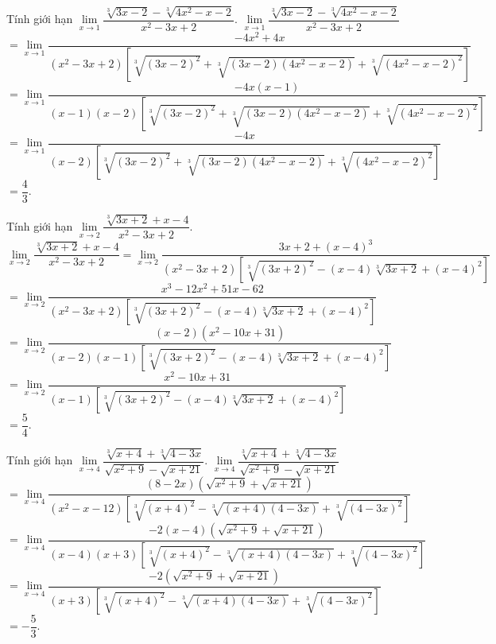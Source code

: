 \begin{bt}%
Tính giới hạn $\lim\limits_{x \to 1}\dfrac{\sqrt[3]{3x-2} - \sqrt[3]{4x^2-x-2}}{x^2 - 3x +2}$.
\loigiai
{
$\lim\limits_{x \to 1}\dfrac{\sqrt[3]{3x-2} - \sqrt[3]{4x^2-x-2}}{x^2 - 3x +2}$\\
$= \lim\limits_{x \to 1}\dfrac{-4x^2+4x}{(x^2-3x+2)\left[\sqrt[3]{(3x-2)^2} + \sqrt[3]{(3x-2)(4x^2-x-2)} + \sqrt[3]{(4x^2-x-2)^2}\right]}$\\
$= \lim\limits_{x \to 1}\dfrac{-4x(x-1)}{(x-1)(x-2)\left[\sqrt[3]{(3x-2)^2} + \sqrt[3]{(3x-2)(4x^2-x-2)} + \sqrt[3]{(4x^2-x-2)^2}\right]}$\\
$= \lim\limits_{x \to 1}\dfrac{-4x}{(x-2)\left[\sqrt[3]{(3x-2)^2} + \sqrt[3]{(3x-2)(4x^2-x-2)} + \sqrt[3]{(4x^2-x-2)^2}\right]}$\\
$= \dfrac{4}{3}$.
}
\end{bt}


\begin{bt}%
Tính giới hạn $\lim\limits_{x \to 2}\dfrac{\sqrt[3]{3x+2} + x - 4}{x^2 - 3x + 2}$.
\loigiai
{
$\lim\limits_{x \to 2}\dfrac{\sqrt[3]{3x+2} + x - 4}{x^2 - 3x + 2} = \lim\limits_{x \to 2}\dfrac{3x + 2 + (x-4)^3}{(x^2 - 3x + 2)\left[\sqrt[3]{(3x+2)^2} - (x-4)\sqrt[3]{3x+2} + (x-4)^2\right]}$\\
$= \lim\limits_{x \to 2}\dfrac{x^3 - 12x^2 + 51x - 62}{(x^2 - 3x + 2)\left[\sqrt[3]{(3x+2)^2} - (x-4)\sqrt[3]{3x+2} + (x-4)^2\right]}$\\
$= \lim\limits_{x \to 2}\dfrac{(x-2)(x^2 - 10x + 31)}{(x-2)(x-1)\left[\sqrt[3]{(3x+2)^2} - (x-4)\sqrt[3]{3x+2} + (x-4)^2\right]}$\\
$= \lim\limits_{x \to 2}\dfrac{x^2 - 10x + 31}{(x-1)\left[\sqrt[3]{(3x+2)^2} - (x-4)\sqrt[3]{3x+2} + (x-4)^2\right]}$\\
$= \dfrac{5}{4}$.
}
\end{bt}


\begin{bt}%
Tính giới hạn $\lim\limits_{x \to 4}\dfrac{\sqrt[3]{x+4} + \sqrt[3]{4-3x}}{\sqrt{x^2+9} - \sqrt{x + 21}}$.
\loigiai
{
$\lim\limits_{x \to 4}\dfrac{\sqrt[3]{x+4} + \sqrt[3]{4-3x}}{\sqrt{x^2+9} - \sqrt{x + 21}}$
$= \lim\limits_{x \to 4}\dfrac{(8-2x)\left(\sqrt{x^2+9} + \sqrt{x + 21}\right)}{(x^2-x-12)\left[\sqrt[3]{(x+4)^2} - \sqrt[3]{(x+4)(4-3x)} + \sqrt[3]{(4-3x)^2}\right]}$\\
$= \lim\limits_{x \to 4}\dfrac{-2(x-4)\left(\sqrt{x^2+9} + \sqrt{x + 21}\right)}{(x-4)(x+3)\left[\sqrt[3]{(x+4)^2} - \sqrt[3]{(x+4)(4-3x)} + \sqrt[3]{(4-3x)^2}\right]}$\\
$= \lim\limits_{x \to 4}\dfrac{-2\left(\sqrt{x^2+9} + \sqrt{x + 21}\right)}{(x+3)\left[\sqrt[3]{(x+4)^2} - \sqrt[3]{(x+4)(4-3x)} + \sqrt[3]{(4-3x)^2}\right]}$\\
$= -\dfrac{5}{3}$.
}
\end{bt}


